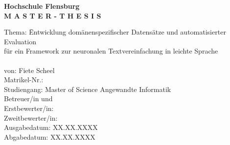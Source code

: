 \begin{center}
    \textbf{Hochschule Flensburg}\\
    \vspace{2cm}
    \textbf{\LARGE M A S T E R - T H E S I S}
\end{center}

\vspace{2cm}


\begin{tabbing}
    Thema: \hspace{2cm} \= Entwicklung domänenspezifischer Datensätze und automatisierter Evaluation\\
    \> für ein Framework zur neuronalen Textvereinfachung in leichte Sprache\\[0.5cm]
    \> \\[0.5cm]
    von: \> Fiete Scheel\\[2cm]
    Matrikel-Nr.: \> \\[0.5cm]
    Studiengang: \> Master of Science Angewandte Informatik \\[0.5cm]
    Betreuer/in und \\
    Erstbewerter/in: \> \\[0.5cm]
    Zweitbewerter/in: \> \\[0.5cm]
    Ausgabedatum: \> XX.XX.XXXX \\[0.5cm]
    Abgabedatum: \> XX.XX.XXXX
\end{tabbing}

